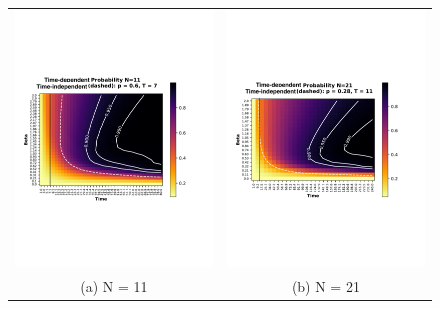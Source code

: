 \documentclass[aps,pra,reprint, onecolumn]{revtex4-2}
\begin{document}
\begin{figure}[ht]
\begin{tabular}{cc}
  \includegraphics[width=90mm]{./figures/11.pdf} &   \includegraphics[width=90mm]{./figures/21.pdf} \\
(a) N = 11 & (b) N = 21\\[6pt]

\end{tabular}
\end{figure}
\end{document}
